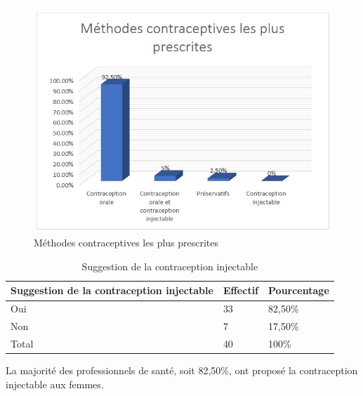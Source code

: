 \begin{figure}[H]
  \centering
  \includegraphics[scale=1.23]{Images/fig_48.jpg}
  \caption{Méthodes contraceptives les plus prescrites}
\end{figure}

\begin{table}[H]
  \centering
  \renewcommand{\arraystretch}{1.5}
  \caption{Suggestion de la contraception injectable}
  \begin{spacing}{1.5} %
  \begin{tabularx}{\textwidth}{|X|X|X|}
      \hline
      \rowcolor{customcolor!90}
      \textbf{\color{white}Suggestion de la \newline contraception injectable} & \textbf{\color{white}Effectif} & \textbf{\color{white}Pourcentage}  \\
      \hline
      Oui & 33 & 82,50\% \\
      \hline
      Non & 7 & 17,50\% \\
     \hline
      Total & 40 & 100\% \\
      \hline
  \end{tabularx}
\end{spacing}

\end{table}

\noindent La majorité des professionnels de santé, soit 82,50\%, ont proposé la contraception injectable aux femmes. 

